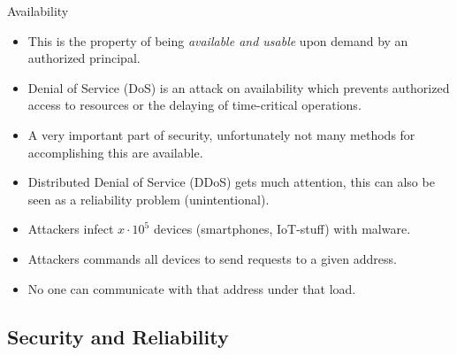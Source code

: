 \begin{frame}
  \begin{block}{Availability}
    \begin{itemize}
      \item This is the property of being \emph{available and usable} upon demand 
        by an authorized principal.

      \item Denial of Service (DoS) is an attack on availability which prevents 
        authorized access to resources or the delaying of time-critical 
        operations.

      \item A very important part of security, unfortunately not many methods for 
        accomplishing this are available.

      \item Distributed Denial of Service (DDoS) gets much attention, this can 
        also be seen as a reliability problem (unintentional).
    \end{itemize}
  \end{block}
\end{frame}

\begin{frame}
  \begin{example}[DDoS]
    \begin{itemize}
      \item Attackers infect \(x\cdot 10^5\) devices (smartphones, IoT-stuff) 
        with malware.
      \item Attackers commands all devices to send requests to a given address.
      \item No one can communicate with that address under that load.
    \end{itemize}
  \end{example}
\end{frame}

\subsection{Security and Reliability}

